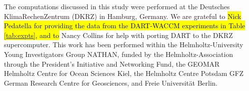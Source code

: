 The computations discussed in this study were performed at the Deutsches KlimaRechenZentrum (DKRZ) in Hamburg, Germany.
We are grateful to \hl{Nick Pedatella for providing the data from the DART-WACCM experiments in Table \ref{tab:expts}, and to}
Nancy Collins for help with porting DART to the DKRZ supercomputer.
This work has been performed within the Helmholtz-University Young Investigators Group NATHAN, funded by the Helmholtz-Association through the President's Initiative and Networking Fund, the GEOMAR Helmholtz Centre for Ocean Sciences Kiel, the Helmholtz Centre Potsdam GFZ German Research Centre for Geosciences, and Freie Universit\"at Berlin.

